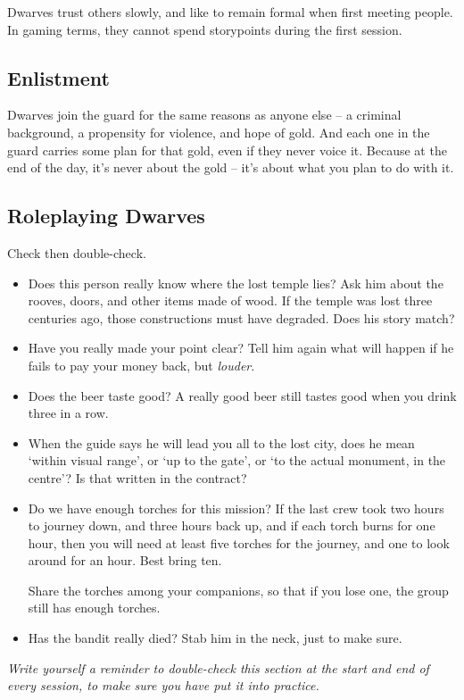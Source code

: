 \begin{multicols}{2}
Dwarves trust others slowly, and like to remain formal when first meeting people.
In gaming terms, they cannot spend \glspl{storypoint} during the first session.

\subsection{Enlistment}

Dwarves join the \gls{guard} for the same reasons as anyone else -- a criminal background, a propensity for violence, and hope of gold.
And each one in the \gls{guard} carries some plan for that gold, even if they never voice it.
Because at the end of the day, it's never about the gold -- it's about what you plan to do with it.

\subsection{Roleplaying Dwarves}

Check then double-check.

\begin{itemize}
  \item
  Does this person really know where the lost temple lies?
  Ask him about the rooves, doors, and other items made of wood.
  If the temple was lost three centuries ago, those constructions must have degraded.
  Does his story match?
  \item
  Have you really made your point clear?
  Tell him again what will happen if he fails to pay your money back, but \emph{louder}.
  \item
  Does the beer taste good?
  A really good beer still tastes good when you drink three in a row.
  \item
  When the guide says he will lead you all to the lost city, does he mean `within visual range', or `up to the gate', or `to the actual monument, in the centre'?
  Is that written in the contract?
  \item
  Do we have enough torches for this mission?
  If the last crew took two hours to journey down, and three hours back up, and if each torch burns for one hour, then you will need at least five torches for the journey, and one to look around for an hour.
  Best bring ten.

  Share the torches among your companions, so that if you lose one, the group still has enough torches.
  \item
  Has the bandit really died?
  Stab him in the neck, just to make sure.
\end{itemize}

\emph{Write yourself a reminder to double-check this section at the start and end of every session, to make sure you have put it into practice.}


\end{multicols}


